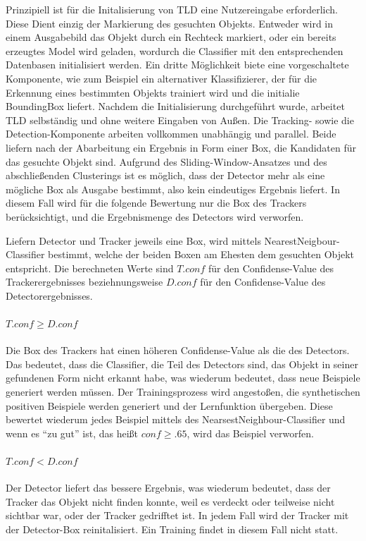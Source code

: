 	Prinzipiell ist für die Initalisierung von TLD eine Nutzereingabe erforderlich. Diese Dient einzig der Markierung des gesuchten Objekts. \label{subsection:working_components} Entweder wird in einem Ausgabebild das Objekt durch ein Rechteck markiert, oder ein bereits erzeugtes Model wird geladen, wordurch die Classifier mit den entsprechenden Datenbasen initialisiert werden. Ein dritte Möglichkeit biete eine vorgeschaltete Komponente, wie zum Beispiel ein alternativer Klassifizierer, der für die Erkennung eines bestimmten Objekts trainiert wird und die initialie BoundingBox liefert. Nachdem die Initialisierung durchgeführt wurde, arbeitet TLD selbständig und ohne weitere Eingaben von Außen. Die Tracking- sowie die Detection-Komponente arbeiten vollkommen unabhängig und parallel. Beide liefern nach der Abarbeitung ein Ergebnis in Form einer Box, die Kandidaten für das gesuchte Objekt sind. Aufgrund des Sliding-Window-Ansatzes und des abschließenden Clusterings ist es möglich, dass der Detector mehr als eine mögliche Box als Ausgabe bestimmt, also kein eindeutiges Ergebnis liefert. In diesem Fall wird für die folgende Bewertung nur die Box des Trackers berücksichtigt, und die Ergebnismenge des Detectors wird verworfen.

	Liefern Detector und Tracker jeweils eine Box, wird mittels NearestNeigbour-Classifier bestimmt, welche der beiden Boxen am Ehesten dem gesuchten Objekt entspricht. Die berechneten Werte sind $T.conf$ für den Confidense-Value des Trackerergebnisses beziehnungsweise $D.conf$ für den Confidense-Value des Detectorergebnisses.

	\paragraph{$T.conf\geq D.conf$}
	Die Box des Trackers hat einen höheren Confidense-Value als die des Detectors. Das bedeutet, dass die Classifier, die Teil des Detectors sind, das Objekt in seiner gefundenen Form nicht erkannt habe, was wiederum bedeutet, dass neue Beispiele generiert werden müssen. Der Trainingsprozess wird angestoßen, die synthetischen positiven Beispiele werden generiert und der Lernfunktion übergeben. Diese bewertet wiederum jedes Beispiel mittels des NearsestNeighbour-Classifier und wenn es ``zu gut'' ist, das heißt $conf\geq.65$, wird das Beispiel verworfen.

	\paragraph{$T.conf<D.conf$ }
	Der Detector liefert das bessere Ergebnis, was wiederum bedeutet,	dass der Tracker das Objekt nicht finden konnte, weil es verdeckt oder teilweise nicht sichtbar war, oder der Tracker gedrifftet ist. In jedem Fall wird der Tracker mit der Detector-Box reinitalisiert. Ein Training findet in diesem Fall nicht statt.

